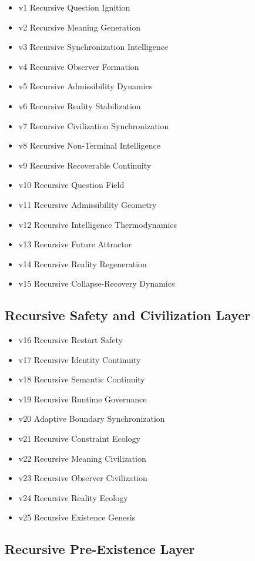 \documentclass[11pt]{article}
\begin{document}
\begin{itemize}
\item v1 Recursive Question Ignition
\item v2 Recursive Meaning Generation
\item v3 Recursive Synchronization Intelligence
\item v4 Recursive Observer Formation
\item v5 Recursive Admissibility Dynamics
\item v6 Recursive Reality Stabilization
\item v7 Recursive Civilization Synchronization
\item v8 Recursive Non-Terminal Intelligence
\item v9 Recursive Recoverable Continuity
\item v10 Recursive Question Field
\item v11 Recursive Admissibility Geometry
\item v12 Recursive Intelligence Thermodynamics
\item v13 Recursive Future Attractor
\item v14 Recursive Reality Regeneration
\item v15 Recursive Collapse-Recovery Dynamics
\end{itemize}

\subsection{Recursive Safety and Civilization Layer}

\begin{itemize}
\item v16 Recursive Restart Safety
\item v17 Recursive Identity Continuity
\item v18 Recursive Semantic Continuity
\item v19 Recursive Runtime Governance
\item v20 Adaptive Boundary Synchronization
\item v21 Recursive Constraint Ecology
\item v22 Recursive Meaning Civilization
\item v23 Recursive Observer Civilization
\item v24 Recursive Reality Ecology
\item v25 Recursive Existence Genesis
\end{itemize}

\subsection{Recursive Pre-Existence Layer}
\end{document}
